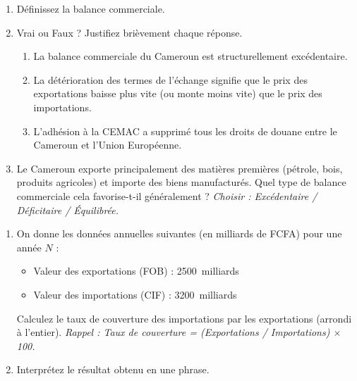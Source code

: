 \documentclass[11pt]{article}
\begin{document}
\begin{exercice}
\begin{enumerate}
    \item Définissez la balance commerciale.
    \item Vrai ou Faux ? Justifiez brièvement chaque réponse.
    \begin{enumerate}
        \item La balance commerciale du Cameroun est structurellement excédentaire.
        \item La détérioration des termes de l'échange signifie que le prix des exportations baisse plus vite (ou monte moins vite) que le prix des importations.
        \item L'adhésion à la CEMAC a supprimé tous les droits de douane entre le Cameroun et l'Union Européenne.
    \end{enumerate}
    \item Le Cameroun exporte principalement des matières premières (pétrole, bois, produits agricoles) et importe des biens manufacturés. Quel type de balance commerciale cela favorise-t-il généralement ? \textit{Choisir : Excédentaire / Déficitaire / Équilibrée.}
\end{enumerate}
\end{exercice}

\begin{exercice}
\begin{enumerate}
    \item On donne les données annuelles suivantes (en milliards de FCFA) pour une année $N$ :
    \begin{itemize}
        \item Valeur des exportations (FOB) : \SI{2500}{milliards}
        \item Valeur des importations (CIF) : \SI{3200}{milliards}
    \end{itemize}
    Calculez le taux de couverture des importations par les exportations (arrondi à l'entier). \textit{Rappel : Taux de couverture = (Exportations / Importations) $\times$ 100.}
    \item Interprétez le résultat obtenu en une phrase.
\end{enumerate}
\end{exercice}
\end{document}
